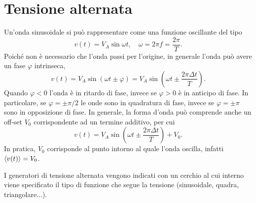 \section{Tensione alternata}
Un'onda sinusoidale si può rappresentare come una funzione oscillante del tipo
\begin{equation}
    v(t)=V_A\sin{\omega t},\quad\omega=2\pi f=\frac{2\pi}{T}.
\end{equation}
Poiché non è necessario che l'onda passi per l'origine, in generale l'onda può avere un fase $\varphi$ intrinseca, 
\begin{equation}
    \label{eq: onda sinusoidale}
    v(t)=V_A\sin{(\omega t\pm\varphi)}=V_A\sin{\left(\omega t\pm\frac{2\pi\Delta t}{T}\right)}.
\end{equation}
Quando $\varphi<0$ l'onda è in ritardo di fase, invece se $\varphi>0$ è in anticipo di fase. In particolare, se $\varphi=\pm\pi/2$ le onde sono in quadratura di fase, invece se $\varphi=\pm\pi$ sono in opposizione di fase. In generale, la forma d'onda può comprende anche un off-set $V_0$ corrispondente ad un termine additivo, per cui
\begin{equation}
    v(t)=V_A\sin{\left(\omega t\pm\frac{2\pi\Delta t}{T}\right)}+V_0.
\end{equation}
In pratica, $V_0$ corrisponde al punto intorno al quale l'onda oscilla, infatti $\braket{v(t)}=V_0$. 
\begin{obs}
    I generatori di tensione alternata vengono indicati con un cerchio al cui interno viene specificato il tipo di funzione che segue la tensione (sinusoidale, quadra, triangolare...).
\end{obs}

